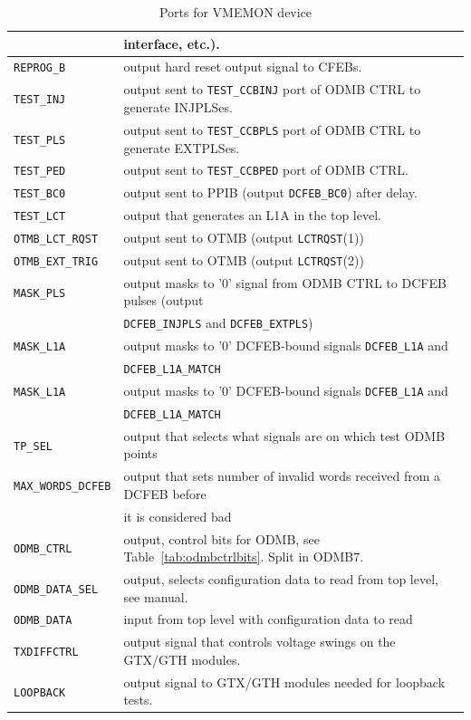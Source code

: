 \documentclass[10pt,a4paper]{article}
\begin{document}
\begin{table}[H]
\begin{tabular}{|l|l|}
                  & interface, etc.).\\ \hline
\texttt{REPROG\_B}& output hard reset output signal to CFEBs.\\ \hline
\texttt{TEST\_INJ}& output sent to \texttt{TEST\_CCBINJ} port of ODMB CTRL to generate INJPLSes. \\ \hline
\texttt{TEST\_PLS}& output sent to \texttt{TEST\_CCBPLS} port of ODMB CTRL to generate EXTPLSes. \\ \hline
\texttt{TEST\_PED}& output sent to \texttt{TEST\_CCBPED} port of ODMB CTRL. \\ \hline
\texttt{TEST\_BC0}& output sent to PPIB (output \texttt{DCFEB\_BC0}) after delay. \\ \hline
\texttt{TEST\_LCT}& output that generates an L1A in the top level. \\ \hline
\texttt{OTMB\_LCT\_RQST}& output sent to OTMB (output \texttt{LCTRQST}(1)) \\ \hline
\texttt{OTMB\_EXT\_TRIG}& output sent to OTMB (output \texttt{LCTRQST}(2)) \\ \hline
\texttt{MASK\_PLS}& output masks to '0' signal from ODMB CTRL to DCFEB pulses (output \\ 
                  & \texttt{DCFEB\_INJPLS} and \texttt{DCFEB\_EXTPLS}) \\ \hline
\texttt{MASK\_L1A}& output masks to '0' DCFEB-bound signals \texttt{DCFEB\_L1A} and \\
                  & \texttt{DCFEB\_L1A\_MATCH} \\ \hline
\texttt{MASK\_L1A}& output masks to '0' DCFEB-bound signals \texttt{DCFEB\_L1A} and \\
                  & \texttt{DCFEB\_L1A\_MATCH} \\ \hline
\texttt{TP\_SEL}& output that selects what signals are on which test ODMB points \\ \hline
\texttt{MAX\_WORDS\_DCFEB}& output that sets number of invalid words received from a DCFEB before \\
                          & it is considered bad\\ \hline
\texttt{ODMB\_CTRL}& output, control bits for ODMB, see Table~\ref{tab:odmbctrlbits}. Split in ODMB7.\\ \hline
\texttt{ODMB\_DATA\_SEL}& output, selects configuration data to read from top level, see manual.\\ \hline
\texttt{ODMB\_DATA}& input from top level with configuration data to read\\ \hline
\texttt{TXDIFFCTRL}& output signal that controls voltage swings on the GTX/GTH modules.\\ \hline
\texttt{LOOPBACK}& output signal to GTX/GTH modules needed for loopback tests.\\ \hline
\end{tabular}
\caption{Ports for VMEMON device}
\label{tab:vmemoninterface}
\end{table}
\end{document}
